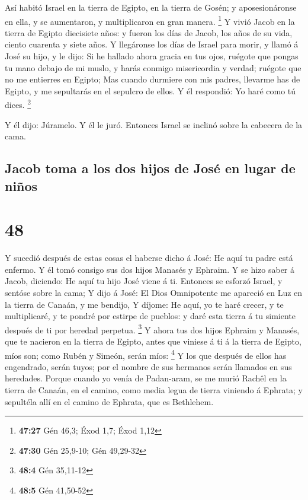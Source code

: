  Así habitó Israel en la tierra de Egipto, en la tierra de
Gosén; y aposesionáronse en ella, y se aumentaron, y multiplicaron en
gran manera. \footnote{\textbf{47:27} Gén 46,3; Éxod 1,7; Éxod 1,12}
 Y vivió Jacob en la tierra de Egipto diecisiete años: y
fueron los días de Jacob, los años de su vida, ciento cuarenta y siete
años.  Y llegáronse los días de Israel para morir, y llamó
á José su hijo, y le dijo: Si he hallado ahora gracia en tus ojos,
ruégote que pongas tu mano debajo de mi muslo, y harás conmigo
misericordia y verdad; ruégote que no me entierres en Egipto;
 Mas cuando durmiere con mis padres, llevarme has de
Egipto, y me sepultarás en el sepulcro de ellos. Y él respondió: Yo haré
como tú dices. \footnote{\textbf{47:30} Gén 25,9-10; Gén 49,29-32}

 Y él dijo: Júramelo. Y él le juró. Entonces Israel se
inclinó sobre la cabecera de la cama.

\hypertarget{jacob-toma-a-los-dos-hijos-de-josuxe9-en-lugar-de-niuxf1os}{%
\subsection{Jacob toma a los dos hijos de José en lugar de
niños}\label{jacob-toma-a-los-dos-hijos-de-josuxe9-en-lugar-de-niuxf1os}}

\hypertarget{section-47}{%
\section{48}\label{section-47}}

 Y sucedió después de estas cosas el haberse dicho á José:
He aquí tu padre está enfermo. Y él tomó consigo sus dos hijos Manasés y
Ephraim.  Y se hizo saber á Jacob, diciendo: He aquí tu hijo
José viene á ti. Entonces se esforzó Israel, y sentóse sobre la cama;
 Y dijo á José: El Dios Omnipotente me apareció en Luz en la
tierra de Canaán, y me bendijo,  Y díjome: He aquí, yo te
haré crecer, y te multiplicaré, y te pondré por estirpe de pueblos: y
daré esta tierra á tu simiente después de ti por heredad perpetua.
\footnote{\textbf{48:4} Gén 35,11-12}  Y ahora tus dos hijos
Ephraim y Manasés, que te nacieron en la tierra de Egipto, antes que
viniese á ti á la tierra de Egipto, míos son; como Rubén y Simeón, serán
míos: \footnote{\textbf{48:5} Gén 41,50-52}  Y los que
después de ellos has engendrado, serán tuyos; por el nombre de sus
hermanos serán llamados en sus heredades.  Porque cuando yo
venía de Padan-aram, se me murió Rachêl en la tierra de Canaán, en el
camino, como media legua de tierra viniendo á Ephrata; y sepultéla allí
en el camino de Ephrata, que es Bethlehem.

